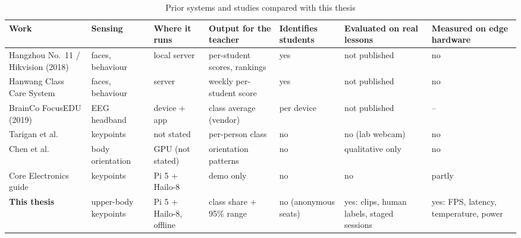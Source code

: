 \begin{table}[htbp]\footnotesize
\caption{Prior systems and studies compared with this thesis}\label{tab:prior-systems-and-studies-compared-with-}
\begin{tabularx}{\textwidth}{*{7}{>{\raggedright\arraybackslash}X}}
\toprule
\textbf{Work} & \textbf{Sensing} & \textbf{Where it runs} & \textbf{Output for the teacher} & \textbf{Identifies students} & \textbf{Evaluated on real lessons} & \textbf{Measured on edge hardware} \\
\midrule
Hangzhou No.~11 / Hikvision (2018) & faces, behaviour & local server & per-student scores, rankings & yes & not published & no \\
Hanwang Class Care System & faces, behaviour & server & weekly per-student score & yes & not published & no \\
BrainCo FocusEDU (2019) & EEG headband & device + app & class average (vendor) & per device & not published & -- \\
Tarigan et al.~\cite{b2} & 7 keypoints & not stated & per-person class & no & no (lab webcam) & no \\
Chen et al.~\cite{b1} & body orientation & GPU (not stated) & orientation patterns & no & qualitative only & no \\
Core Electronics guide \cite{b6} & 17 keypoints & Pi 5 + Hailo-8 & demo only & no & no & partly \\
\textbf{This thesis} & 13 upper-body keypoints & Pi 5 + Hailo-8, offline & class share + 95\% range & no (anonymous seats) & yes: clips, human labels, staged sessions & yes: FPS, latency, temperature, power \\
\bottomrule
\end{tabularx}
\end{table}
